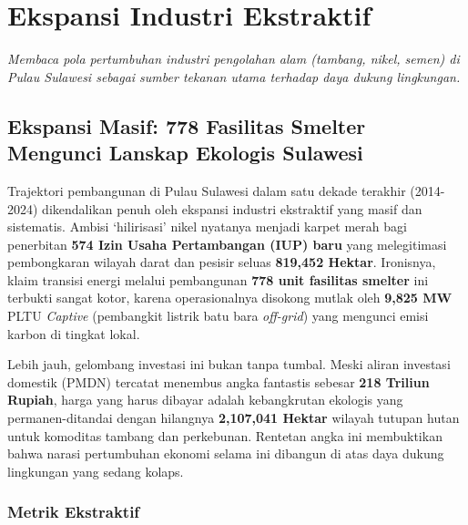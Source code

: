 \documentclass[
]{article}
\author{}
\date{}
\begin{document}
\section{Ekspansi Industri
Ekstraktif}\label{ekspansi-industri-ekstraktif}

\emph{Membaca pola pertumbuhan industri pengolahan alam (tambang, nikel,
semen) di Pulau Sulawesi sebagai sumber tekanan utama terhadap daya
dukung lingkungan.}

\subsection{Ekspansi Masif: 778 Fasilitas Smelter Mengunci Lanskap
Ekologis
Sulawesi}\label{ekspansi-masif-778-fasilitas-smelter-mengunci-lanskap-ekologis-sulawesi}

Trajektori pembangunan di Pulau Sulawesi dalam satu dekade terakhir
(2014-2024) dikendalikan penuh oleh ekspansi industri ekstraktif yang
masif dan sistematis. Ambisi `hilirisasi' nikel nyatanya menjadi karpet
merah bagi penerbitan \textbf{574 Izin Usaha Pertambangan (IUP) baru}
yang melegitimasi pembongkaran wilayah darat dan pesisir seluas
\textbf{819,452 Hektar}. Ironisnya, klaim transisi energi melalui
pembangunan \textbf{778 unit fasilitas smelter} ini terbukti sangat
kotor, karena operasionalnya disokong mutlak oleh \textbf{9,825 MW} PLTU
\emph{Captive} (pembangkit listrik batu bara \emph{off-grid}) yang
mengunci emisi karbon di tingkat lokal.

Lebih jauh, gelombang investasi ini bukan tanpa tumbal. Meski aliran
investasi domestik (PMDN) tercatat menembus angka fantastis sebesar
\textbf{218 Triliun Rupiah}, harga yang harus dibayar adalah
kebangkrutan ekologis yang permanen-ditandai dengan hilangnya
\textbf{2,107,041 Hektar} wilayah tutupan hutan untuk komoditas tambang
dan perkebunan. Rentetan angka ini membuktikan bahwa narasi pertumbuhan
ekonomi selama ini dibangun di atas daya dukung lingkungan yang sedang
kolaps.

\subsubsection{Metrik Ekstraktif}\label{metrik-ekstraktif}
\end{document}
